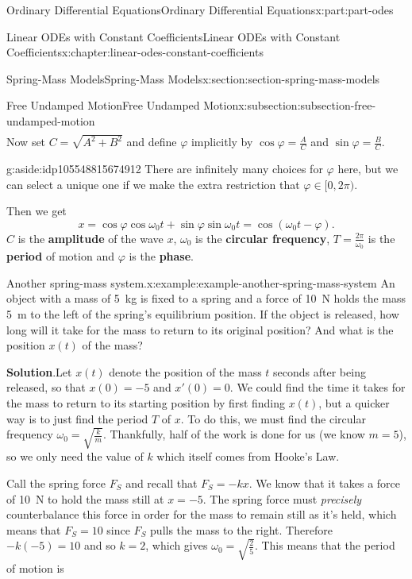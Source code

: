 \documentclass[twoside,10pt,]{book}
\newcommand{\blocktitlefont}{\relax}
\newcommand{\terminology}[1]{\textbf{#1}}
\numberwithin{equation}{part}
\begin{document}
\begin{partptx}{Ordinary Differential Equations}{}{Ordinary Differential Equations}{}{}{x:part:part-odes}
\begin{chapterptx}{Linear ODEs with Constant Coefficients}{}{Linear ODEs with Constant Coefficients}{}{}{x:chapter:linear-odes-constant-coefficients}
\begin{sectionptx}{Spring-Mass Models}{}{Spring-Mass Models}{}{}{x:section:section-spring-mass-models}
\begin{subsectionptx}{Free Undamped Motion}{}{Free Undamped Motion}{}{}{x:subsection:subsection-free-undamped-motion}
\begin{align*}
\end{align*}
Now set \(C = \sqrt{A^{2} + B^{2}}\) and define \(\varphi\) implicitly by \(\cos\varphi = \frac{A}{C}\) and \(\sin\varphi = \frac{B}{C}\). \begin{aside}{}{g:aside:idp105548815674912}%
There are infinitely many choices for \(\varphi\) here, but we can select a unique one if we make the extra restriction that \(\varphi\in[0,2\pi)\).%
\end{aside}
 Then we get%
\begin{equation*}
x = \cos\varphi\cos\omega_{0}t + \sin\varphi\sin\omega_{0}t = \cos(\omega_{0}t - \varphi).
\end{equation*}
\(C\) is the \terminology{amplitude} of the wave \(x\), \(\omega_{0}\) is the \terminology{circular frequency}, \(T = \frac{2\pi}{\omega_{0}}\) is the \terminology{period} of motion and \(\varphi\) is the \terminology{phase}.%
\begin{example}{Another spring-mass system.}{x:example:example-another-spring-mass-system}%
An object with a mass of \SI{5}{\kilo\gram} is fixed to a spring and a force of \SI{10}{\newton} holds the mass \SI{5}{\meter} to the left of the spring's equilibrium position. If the object is released, how long will it take for the mass to return to its original position? And what is the position \(x(t)\) of the mass?%
\par\smallskip%
\noindent\textbf{\blocktitlefont Solution}.\hypertarget{g:solution:idp105548815683744}{}\quad{}Let \(x(t)\) denote the position of the mass \(t\) seconds after being released, so that \(x(0) = -5\) and \(x'(0) = 0\). We could find the time it takes for the mass to return to its starting position by first finding \(x(t)\), but a quicker way is to just find the period \(T\) of \(x\). To do this, we must find the circular frequency \(\omega_{0} = \sqrt{\frac{k}{m}}\). Thankfully, half of the work is done for us (we know \(m=5\)), so we only need the value of \(k\) which itself comes from Hooke's Law.%
\par
Call the spring force \(F_{S}\) and recall that \(F_{S} = -kx\). We know that it takes a force of \SI{10}{\newton} to hold the mass still at \(x=-5\). The spring force must \emph{precisely} counterbalance this force in order for the mass to remain still as it's held, which means that \(F_{S} = 10\) since \(F_{S}\) pulls the mass to the right. Therefore \(-k(-5) = 10\) and so \(k=2\), which gives \(\omega_{0} = \sqrt{\frac{2}{5}}\). This means that the period of motion is%
\begin{equation*}

\end{equation*}
\end{example}
\end{subsectionptx}
\end{sectionptx}
\end{chapterptx}
\end{partptx}
\end{document}
